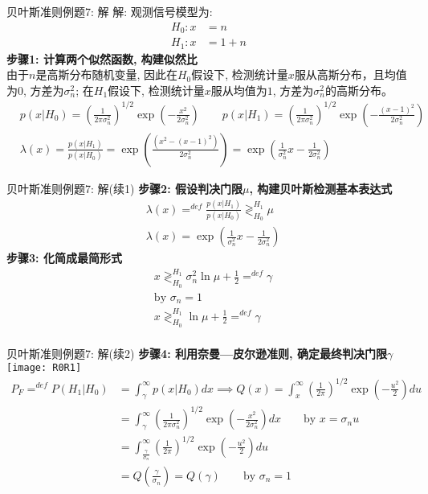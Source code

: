 \begin{frame}[shrink]{贝叶斯准则例题7: 解}
解: 观测信号模型为:
\begin{align*}
H_0: x&=n  \\
H_1: x&=1+n
\end{align*}
\textbf{步骤1: 计算两个似然函数, 构建似然比}\\
由于$n$是高斯分布随机变量, 因此在$H_0$假设下, 检测统计量$x$服从高斯分布，且均值为0, 方差为$\sigma_n^2$; 在$H_1$假设下, 检测统计量$x$服从均值为$1$, 方差为$\sigma_n^2$的高斯分布。
\begin{align*}
&p(x|H_0)=\left(\frac{1}{2\pi\sigma_n^2}\right)^{1/2}\exp\left(-\frac{x^2}{2\sigma_n^2}\right) \qquad p(x|H_1)=\left(\frac{1}{2\pi\sigma_n^2}\right)^{1/2}\exp\left(-\frac{(x-1)^2}{2\sigma_n^2}\right)\\
&\lambda(x)=\frac{p(x|H_1)}{p(x|H_0)}=\exp\left(\frac{(x^2-(x-1)^2)}{2\sigma_n^2}\right)=\exp\left(\frac{1}{\sigma_n^2}x-\frac{1}{2\sigma_n^2}\right)
\end{align*} 
\end{frame}

\begin{frame}[shrink]{贝叶斯准则例题7: 解(续1)}
\textbf{步骤2: 假设判决门限$\mu$, 构建贝叶斯检测基本表达式}
\begin{align*}
&\lambda(x)\mathop{=}^{def}\frac{p(x|H_1)}{p(x|H_0)}\mathop{\gtrless}_{H_0}^{H_1}\mu\\
&\lambda(x)=\exp\left(\frac{1}{\sigma_n^2}x-\frac{1}{2\sigma_n^2}\right)
\end{align*} 
\textbf{步骤3: 化简成最简形式}
\begin{align*}
&x\mathop{\gtrless}_{H_0}^{H_1}\sigma_n^2\ln\mu+\frac{1}{2}\mathop{=}^{def}\gamma\\
&\text{by }\sigma_n=1\\
&x\mathop{\gtrless}_{H_0}^{H_1}\ln\mu+\frac{1}{2}\mathop{=}^{def}\gamma\\
\end{align*} 
\end{frame}

\begin{frame}[shrink]{贝叶斯准则例题7: 解(续2)}
\textbf{步骤4: 利用奈曼---皮尔逊准则, 确定最终判决门限$\gamma$}
\texttt{[image: R0R1]}
\begin{align*}
P_F\mathop{=}^{def}P(H_1|H_0)&=\int_{\gamma}^{\infty}p(x|H_0)dx\implies Q(x)=\int_{x}^{\infty}\left(\frac{1}{2\pi}\right)^{1/2}\exp\left(-\frac{u^2}{2}\right)du\\
&=\int_{\gamma}^{\infty}\left(\frac{1}{2\pi\sigma_n^2}\right)^{1/2}\exp\left(-\frac{x^2}{2\sigma_n^2}\right)dx\qquad \text{by } x=\sigma_nu\\
&=\int_{\frac{\gamma}{\sigma_n}}^{\infty}\left(\frac{1}{2\pi}\right)^{1/2}\exp\left(-\frac{u^2}{2}\right)du\\
&=Q\left(\frac{\gamma}{\sigma_n}\right)=Q(\gamma)\qquad \text{by }\sigma_n=1
\end{align*}
\end{frame}


